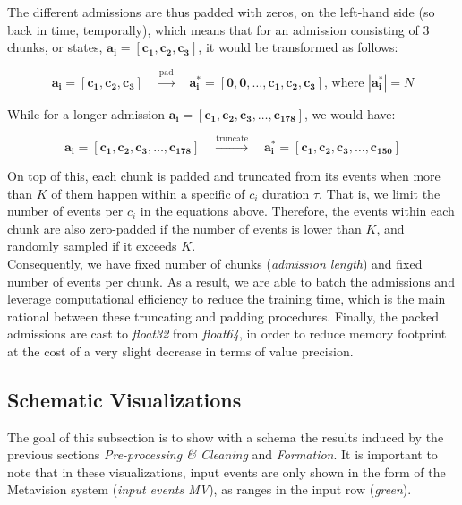 The different admissions are thus padded with zeros, on the left-hand side (so back in time, temporally), which means that for an admission consisting of 3 chunks, or states, $\bm{a_i}=[\bm{c_1}, \bm{c_2}, \bm{c_3}]$, it would be transformed as follows:

\begin{equation*}
\bm{a_i}=[\bm{c_1}, \bm{c_2}, \bm{c_3}] \quad \xrightarrow{\mbox{pad}} \quad \bm{a_i^*}=[\bm{0}, \bm{0}, \dots, \bm{c_1}, \bm{c_2}, \bm{c_3}]\mbox{, where }|\bm{a_i^*}|=N
\end{equation*}

While for a longer admission $\bm{a_i}=[\bm{c_1}, \bm{c_2}, \bm{c_3}, \dots, \bm{c_{178}}]$, we would have:

\begin{equation*}
\bm{a_i}=[\bm{c_1}, \bm{c_2}, \bm{c_3}, \dots, \bm{c_{178}}] \quad \xrightarrow{\mbox{truncate}} \quad \bm{a_i^*}=[\bm{c_1}, \bm{c_2}, \bm{c_3}, \dots, \bm{c_{150}}]
\end{equation*}

On top of this, each chunk is padded and truncated from its events when more than $K$ of them happen within a specific of $c_i$ duration $\tau$. That is, we limit the number of events per $c_i$ in the equations above. Therefore, the events within each chunk are also zero-padded if the number of events is lower than $K$, and randomly sampled if it exceeds $K$.\\

Consequently, we have fixed number of chunks (\textit{admission length}) and fixed number of events per chunk. As a result, we are able to batch the admissions and leverage computational efficiency to reduce the training time, which is the main rational between these truncating and padding procedures. Finally, the packed admissions are cast to \emph{float32} from \emph{float64}, in order to reduce memory footprint at the cost of a very slight decrease in terms of value precision.

\newpage
\subsection{Schematic Visualizations}
The goal of this subsection is to show with a schema the results induced by the previous sections \emph{Pre-processing \& Cleaning} and \emph{Formation}. It is important to note that in these visualizations, input events are only shown in the form of the Metavision system (\textit{input events MV}), as ranges in the input row (\textit{green}). \\

